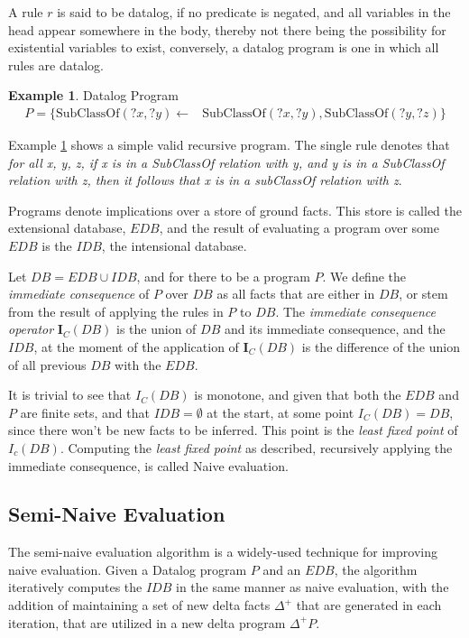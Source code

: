 \documentclass[sigconf,screen,review,natbib]{acmart}
\theoremstyle{definition}
\newtheorem{exmp}{Example}[section]
\begin{document}
A rule $r$ is said to be datalog, if no predicate is negated, and all variables in the head appear somewhere in the body,
thereby not there being the possibility for existential variables to exist, conversely, a datalog program is one in which
all rules are datalog.
\begin{exmp}{Datalog Program}\label{ex1}
	\begin{align*}
		P = \{\text{SubClassOf}(?x, ?y) \leftarrow & \text{SubClassOf}(?x, ?y), \text{SubClassOf}(?y, ?z) \}
	\end{align*}
\end{exmp}
Example \ref{ex1} shows a simple valid recursive program. The single rule denotes that \textit{for all x, y, z, if x is
	in a SubClassOf relation with y, and y is in a SubClassOf relation with z, then it follows that x is in a subClassOf
	relation with z}.

Programs denote implications over a store of ground facts. This store is called the extensional database, $EDB$, and the result
of evaluating a program over some $EDB$ is the $IDB$, the intensional database.

Let $DB = EDB \cup IDB$, and for there to be a program $P$. We define the \textit{immediate consequence} of $P$ over $DB$ as
all facts that are either in $DB$, or stem from the result of applying the rules in $P$ to $DB$. The \textit{immediate consequence operator}
$\textbf{I}_C(DB)$ is the union of $DB$ and its immediate consequence, and the $IDB$, at the moment of the
application of $\textbf{I}_C(DB)$ is the difference of the union of all previous $DB$ with the $EDB$.

It is trivial to see that $I_C(DB)$ is monotone, and given that both the $EDB$ and $P$ are finite sets, and
that $IDB = \emptyset$ at the start, at some point $I_C(DB) = DB$, since there won't be new facts to be inferred. This
point is the \textit{least fixed point} of $I_c(DB)$\cite{datalog}. Computing the \textit{least fixed point} as
described, recursively applying the immediate consequence, is called Naive evaluation.
\subsection{Semi-Naive Evaluation}
The semi-naive evaluation algorithm \cite{datalog} is a widely-used technique for improving naive evaluation.
Given a Datalog program $P$ and an $EDB$, the algorithm iteratively computes the $IDB$ in the same manner as
naive evaluation, with the addition of maintaining a set of new delta facts $\Delta^+$ that are generated in
each iteration, that are utilized in a new delta program $\Delta^+P$.
\end{document}
